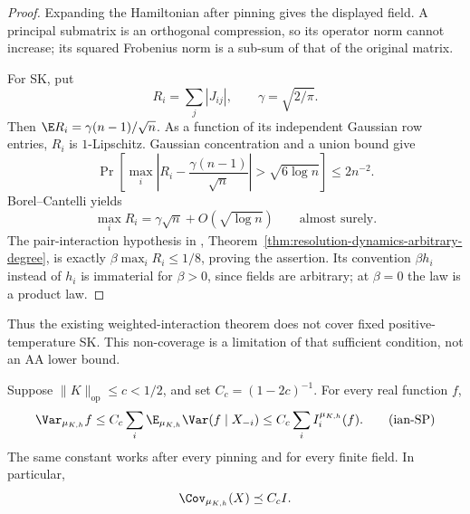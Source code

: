 \begin{proof}
Expanding the Hamiltonian after pinning gives the displayed field.
A principal submatrix is an orthogonal compression, so its operator
norm cannot increase; its squared Frobenius norm is a sub-sum of that
of the original matrix.

For SK, put
\[
 R_i=\sum_j|J_{ij}|,\qquad \gamma=\sqrt{2/\pi}.
\]
Then \(\E R_i=\gamma(n-1)/\sqrt n\). As a function of its independent
Gaussian row entries, \(R_i\) is \(1\)-Lipschitz. Gaussian concentration
and a union bound give
\[
 \Pr\left[
 \max_i\left|R_i-\frac{\gamma(n-1)}{\sqrt n}\right|
 >\sqrt{6\log n}\right]\le 2n^{-2}.
\]
Borel--Cantelli yields
\[
 \max_iR_i=\gamma\sqrt n+O(\sqrt{\log n})
 \qquad\text{almost surely}.
\]
The pair-interaction hypothesis in
,
Theorem~\ref{thm:resolution-dynamics-arbitrary-degree}, is exactly
\(\beta\max_iR_i\le1/8\), proving the assertion.
Its convention \(\beta h_i\) instead of \(h_i\) is immaterial for
\(\beta>0\), since fields are arbitrary; at \(\beta=0\) the law is a
product law.
\end{proof}

Thus the existing weighted-interaction theorem does not cover fixed
positive-temperature SK. This non-coverage is a limitation of that
sufficient condition, not an AA lower bound.

\begin{lemma}
\label{ian:spectral-poincare}
Suppose \(\|K\|_{\mathrm{op}}\le c<1/2\), and set
\(C_c=(1-2c)^{-1}\). For every real function \(f\),
\[
 \Var_{\mu_{K,h}}f
 \le C_c\sum_i
       \E_{\mu_{K,h}}\Var(f\mid X_{-i})
 \le C_c\sum_i I_i^{\mu_{K,h}}(f).
 \tag{ian-SP}
\]
The same constant works after every pinning and for every finite field.
In particular,
\[
 \Cov_{\mu_{K,h}}(X)\preceq C_c I.
\]
\end{lemma}

